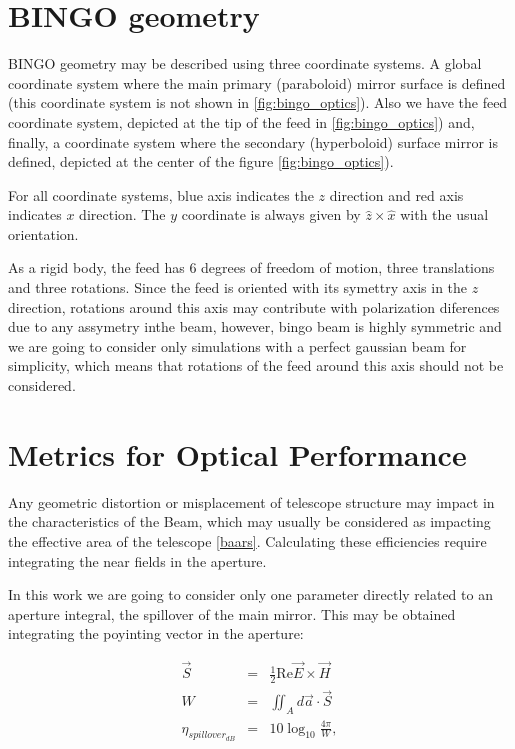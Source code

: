 \documentclass{ws-jai}
\begin{document}
\section{BINGO geometry}

BINGO geometry may be described using three coordinate systems. A global coordinate system where the main primary (paraboloid) mirror surface is defined (this coordinate system is not shown in \ref{fig:bingo_optics}). Also we have the feed coordinate system, depicted at the tip of the feed in \ref{fig:bingo_optics}) and, finally, a coordinate system where the secondary (hyperboloid) surface mirror is defined, depicted at the center of the figure \ref{fig:bingo_optics}).

For all coordinate systems, blue axis indicates the $z$ direction and red axis indicates $x$ direction. The $y$ coordinate is always given by $\hat z \times \hat x$ with the usual orientation.

As a rigid body, the feed has 6 degrees of freedom of motion, three translations and three rotations. Since the feed is oriented with its symettry axis in the $z$ direction, rotations around this axis may contribute with polarization diferences due to any assymetry inthe beam, however, bingo beam is highly symmetric and we are going to consider only simulations with a perfect gaussian beam for simplicity, which means that rotations of the feed around this axis should not be considered.


\section{Metrics for Optical Performance}

Any geometric distortion or misplacement of telescope structure may impact in the characteristics of the Beam, which may usually be considered as impacting the effective area of the telescope \ref{baars}. Calculating these efficiencies require integrating the near fields in the aperture.

In this work we are going to consider only one parameter directly related to an aperture integral, the spillover of the main mirror. This may be obtained integrating the poyinting vector in the aperture:

\begin{eqnarray}
\vec S &=& \frac{1}{2} \mathrm{Re} \vec E \times \vec H\\
W &=& \iint_A d\vec a \cdot \vec S \\
\eta_{spillover_{dB}} &=& 10 \log_{10} \frac{4\pi}{W},
\end{eqnarray}
\end{document}
